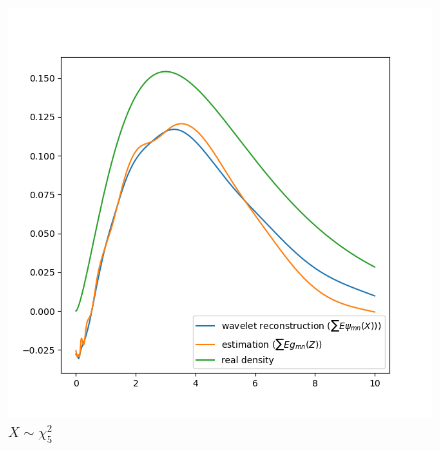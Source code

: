 \documentclass[12pt, a4paper]{report}
\begin{document}
\begin{figure}[h]
    \caption{$X \sim \chi^2_5$}
    \centering
    \includegraphics[width=\textwidth]{chisq}
\end{figure}

%
\end{document}
